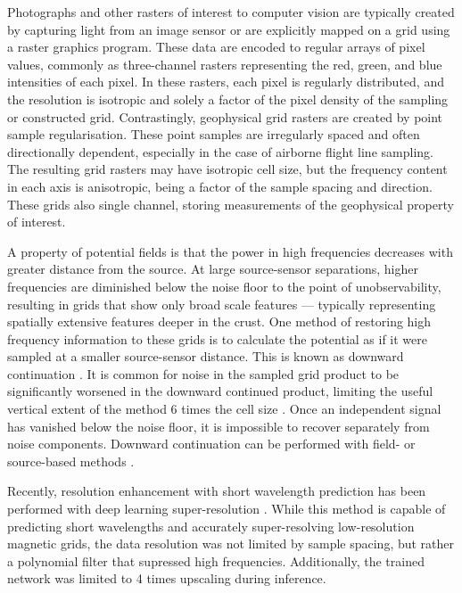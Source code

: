 \documentclass{article}
\begin{document}
Photographs and other rasters of interest to computer vision are typically created by capturing light from an image sensor or are explicitly mapped on a grid using a raster graphics program.
These data are encoded to regular arrays of pixel values, commonly as three-channel rasters representing the red, green, and blue intensities of each pixel.
In these rasters, each pixel is regularly distributed, and the resolution is isotropic and solely a factor of the pixel density of the sampling or constructed grid.
Contrastingly, geophysical grid rasters are created by point sample regularisation.
These point samples are irregularly spaced and often directionally dependent, especially in the case of airborne flight line sampling.
The resulting grid rasters may have isotropic cell size, but the frequency content in each axis is anisotropic, being a factor of the sample spacing and direction.
These grids also single channel, storing measurements of the geophysical property of interest.

A property of potential fields is that the power in high frequencies decreases with greater distance from the source.
At large source-sensor separations, higher frequencies are diminished below the noise floor to the point of unobservability, resulting in grids that show only broad scale features --- typically representing spatially extensive features deeper in the crust.
One method of restoring high frequency information to these grids is to calculate the potential as if it were sampled at a smaller source-sensor distance.
This is known as downward continuation \parencite{bullardDeterminationMassesNecessary1948}.
It is common for noise in the sampled grid product to be significantly worsened in the downward continued product, limiting the useful vertical extent of the method 6 times the cell size \parencite{dampneyEquivalentSourceTechnique1969,zuoDownwardContinuationTransformation2020}.
Once an independent signal has vanished below the noise floor, it is impossible to recover separately from noise components.
Downward continuation can be performed with field- or source-based methods \parencite{pilkingtonPotentialFieldContinuation2017}.

Recently, resolution enhancement with short wavelength prediction has been performed with deep learning super-resolution \parencite{smithMagneticGridResolution2022}.
While this method is capable of predicting short wavelengths and accurately super-resolving low-resolution magnetic grids, the data resolution was not limited by sample spacing, but rather a polynomial filter that supressed high frequencies.
Additionally, the trained network was limited to \num{4} times upscaling during inference.
\end{document}
